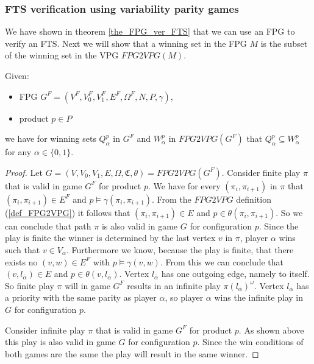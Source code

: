 \subsubsection{FTS verification using variability parity games}
We have shown in theorem \ref{the_FPG_ver_FTS} that we can use an FPG to verify an FTS. Next we will show that a winning set in the FPG $M$ is the subset of the winning set in the VPG $\textit{FPG2VPG}(M)$.
\begin{theorem}
	\label{the_FPG_sub_VPG}
	Given:
	\begin{itemize}
		\item FPG $G^F = (V^F, V_0^F, V_1^F, E^F, \Omega^F, N, P, \gamma)$,
		\item product $p \in P$
	\end{itemize}
	we have for winning sets $Q_\alpha^{p}$ in $G^F$ and $W_\alpha^{p}$ in $\textit{FPG2VPG}(G^F)$ that $Q_\alpha^{p} \subseteq W_\alpha^{p}$ for any $\alpha \in \{0,1\}$.
	\begin{proof}
		Let $G = (V,V_0,V_1, E, \Omega, \mathfrak{C},\theta) = \textit{FPG2VPG}(G^F)$. Consider finite play $\pi$ that is valid in game $G^F$ for product $p$. We have for every $(\pi_i, \pi_{i+1})$ in $\pi$ that $(\pi_i, \pi_{i+1}) \in E^F$ and $p \models \gamma(\pi_i, \pi_{i+1})$. From the $\textit{FPG2VPG}$ definition (\ref{def_FPG2VPG}) it follows that $(\pi_i, \pi_{i+1}) \in E$ and $p \in \theta(\pi_i, \pi_{i+1})$. So we can conclude that path $\pi$ is also valid in game $G$ for configuration $p$. Since the play is finite the winner is determined by the last vertex $v$ in $\pi$, player $\alpha$ wins such that $v \in V_{\overline{\alpha}}$. Furthermore we know, because the play is finite, that there exists no $(v,w) \in E^F$ with $p \models \gamma(v,w)$. From this we can conclude that $(v, l_{\overline{\alpha}}) \in E$ and $p \in \theta(v, l_{\overline{\alpha}})$. Vertex $l_{\overline{\alpha}}$ has one outgoing edge, namely to itself. So finite play $\pi$ will in game $G^F$ results in an infinite play $\pi(l_{\overline{\alpha}})^\omega$. Vertex $l_{\overline{\alpha}}$ has a priority with the same parity as player $\alpha$, so player $\alpha$ wins the infinite play in $G$ for configuration $p$.
		
		Consider infinite play $\pi$ that is valid in game $G^F$ for product $p$. As shown above this play is also valid in game $G$ for configuration $p$. Since the win conditions of both games are the same the play will result in the same winner.
		

\end{proof}
\end{theorem}
